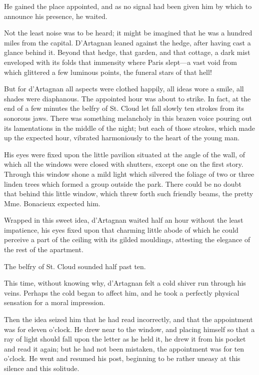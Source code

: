 He gained the place appointed, and as no signal had been given him by which to announce his presence, he waited. 

Not the least noise was to be heard; it might be imagined that he was a hundred miles from the capital. D'Artagnan leaned against the hedge, after having cast a glance behind it. Beyond that hedge, that garden, and that cottage, a dark mist enveloped with its folds that immensity where Paris slept---a vast void from which glittered a few luminous points, the funeral stars of that hell! 

But for d'Artagnan all aspects were clothed happily, all ideas wore a smile, all shades were diaphanous. The appointed hour was about to strike. In fact, at the end of a few minutes the belfry of St. Cloud let fall slowly ten strokes from its sonorous jaws. There was something melancholy in this brazen voice pouring out its lamentations in the middle of the night; but each of those strokes, which made up the expected hour, vibrated harmoniously to the heart of the young man. 

His eyes were fixed upon the little pavilion situated at the angle of the wall, of which all the windows were closed with shutters, except one on the first story. Through this window shone a mild light which silvered the foliage of two or three linden trees which formed a group outside the park. There could be no doubt that behind this little window, which threw forth such friendly beams, the pretty Mme. Bonacieux expected him. 

Wrapped in this sweet idea, d'Artagnan waited half an hour without the least impatience, his eyes fixed upon that charming little abode of which he could perceive a part of the ceiling with its gilded mouldings, attesting the elegance of the rest of the apartment. 

The belfry of St. Cloud sounded half past ten. 

This time, without knowing why, d'Artagnan felt a cold shiver run through his veins. Perhaps the cold began to affect him, and he took a perfectly physical sensation for a moral impression. 

Then the idea seized him that he had read incorrectly, and that the appointment was for eleven o'clock. He drew near to the window, and placing himself so that a ray of light should fall upon the letter as he held it, he drew it from his pocket and read it again; but he had not been mistaken, the appointment was for ten o'clock. He went and resumed his post, beginning to be rather uneasy at this silence and this solitude. 

